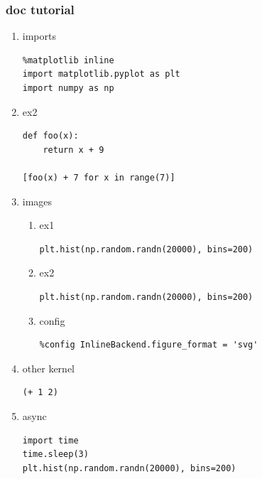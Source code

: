 \documentclass[11pt]{article}
\begin{document}
\subsubsection{doc tutorial}
\label{sec:org9c4d7eb}
\begin{enumerate}
\item imports
\label{sec:org6145962}
\begin{verbatim}
%matplotlib inline
import matplotlib.pyplot as plt
import numpy as np
\end{verbatim}

\item ex2
\label{sec:org8edb755}
\begin{verbatim}
def foo(x):
    return x + 9

[foo(x) + 7 for x in range(7)]
\end{verbatim}

\item images
\label{sec:org6a8e8ab}
\begin{enumerate}
\item ex1
\label{sec:org9a2b9fa}
\begin{verbatim}
plt.hist(np.random.randn(20000), bins=200)
\end{verbatim}

\item ex2
\label{sec:org0ae1e29}
\begin{verbatim}
plt.hist(np.random.randn(20000), bins=200)
\end{verbatim}

\item config
\label{sec:orgb8a789c}
\begin{verbatim}
%config InlineBackend.figure_format = 'svg'
\end{verbatim}
\end{enumerate}

\item other kernel
\label{sec:orgb42ba7b}
\begin{verbatim}
(+ 1 2)
\end{verbatim}

\item async
\label{sec:org213139c}
\begin{verbatim}
import time
time.sleep(3)
plt.hist(np.random.randn(20000), bins=200)
\end{verbatim}
\end{enumerate}
\end{document}
